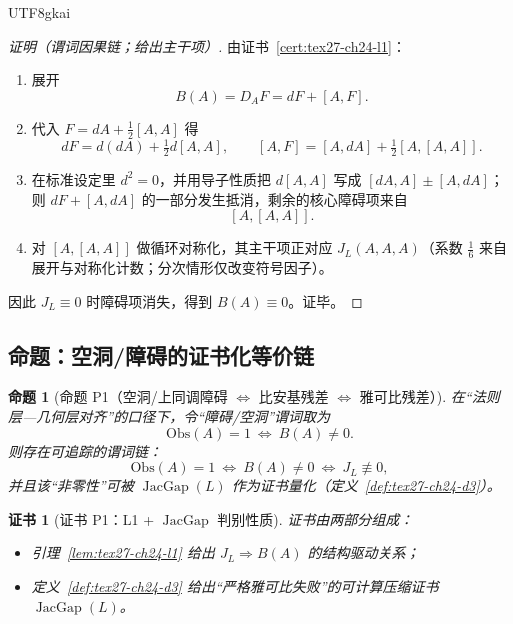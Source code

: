 \documentclass[12pt]{article}
\newtheorem{proposition}{命题}[section]
\newtheorem{Certificate}{证书}[section]
\newcommand{\JacGap}{\operatorname{JacGap}}
\begin{document}
\begin{CJK*}{UTF8}{gkai}
\begin{proof}[证明（谓词因果链；给出主干项）]
由证书~\ref{cert:tex27-ch24-l1}：
\begin{enumerate}
  \item 展开
  \[
    B(A)=D_A F=dF+[A,F].
  \]
  \item 代入 $F=dA+\tfrac12[A,A]$ 得
  \[
    dF=d(dA)+\tfrac12 d[A,A],\qquad
    [A,F]=[A,dA]+\tfrac12[A,[A,A]].
  \]
  \item 在标准设定里 $d^2=0$，并用导子性质把 $d[A,A]$ 写成 $[dA,A]\pm[A,dA]$；
  则 $dF+[A,dA]$ 的一部分发生抵消，剩余的核心障碍项来自
  \[
    [A,[A,A]].
  \]
  \item 对 $[A,[A,A]]$ 做循环对称化，其主干项正对应 $J_L(A,A,A)$（系数 $\tfrac16$ 来自展开与对称化计数；分次情形仅改变符号因子）。
\end{enumerate}
因此 $J_L\equiv 0$ 时障碍项消失，得到 $B(A)\equiv 0$。证毕。
\end{proof}

\subsection{命题：空洞/障碍的证书化等价链}
\label{subsec:tex27-ch24-prop}

\begin{proposition}[命题 P1（空洞/上同调障碍 $\Longleftrightarrow$ 比安基残差 $\Longleftrightarrow$ 雅可比残差）]
\label{prop:tex27-ch24-p1}
在“法则层—几何层对齐”的口径下，令“障碍/空洞”谓词取为
\[
  \mathrm{Obs}(A)=1\ \Longleftrightarrow\ B(A)\neq 0.
\]
则存在可追踪的谓词链：
\[
  \mathrm{Obs}(A)=1
  \ \Longleftrightarrow\
  B(A)\neq 0
  \ \Longleftrightarrow\
  J_L\not\equiv 0,
\]
并且该“非零性”可被 $\JacGap(L)$ 作为证书量化（定义~\ref{def:tex27-ch24-d3}）。
\end{proposition}

\begin{Certificate}[证书 P1：L1 + $\JacGap$ 判别性质]
\label{cert:tex27-ch24-p1}
证书由两部分组成：
\begin{itemize}
  \item 引理~\ref{lem:tex27-ch24-l1} 给出 $J_L\Rightarrow B(A)$ 的结构驱动关系；
  \item 定义~\ref{def:tex27-ch24-d3} 给出“严格雅可比失败”的可计算压缩证书 $\JacGap(L)$。
\end{itemize}
\end{Certificate}


\end{CJK*}
\end{document}
